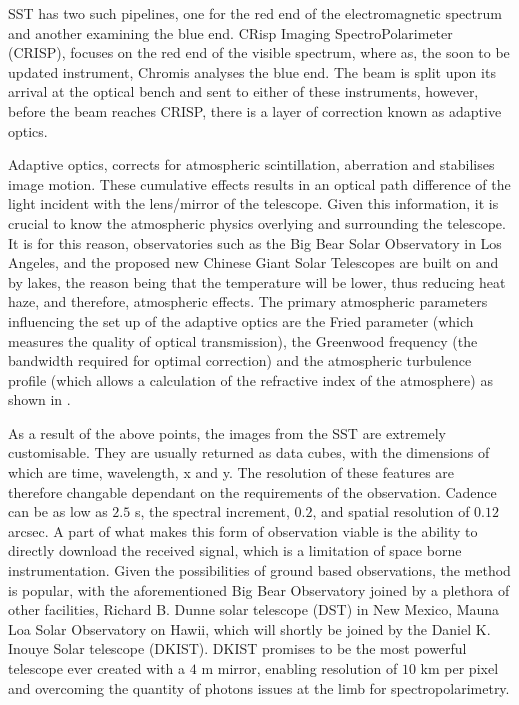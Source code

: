 SST has two such pipelines, one for the red end of the electromagnetic spectrum and another examining the blue end.
CRisp Imaging SpectroPolarimeter (CRISP), focuses on the red end of the visible spectrum, where as, the soon to be updated instrument, Chromis analyses the blue end.
The beam is split upon its arrival at the optical bench and sent to either of these instruments, however, before the beam reaches CRISP, there is a layer of correction known as adaptive optics.

Adaptive optics, corrects for atmospheric scintillation, aberration and stabilises image motion.
These cumulative effects results in an optical path difference of the light incident with the lens/mirror of the telescope.
Given this information, it is crucial to know the atmospheric physics overlying and surrounding the telescope.
It is for this reason, observatories such as the Big Bear Solar Observatory \citep{Cao2010} in Los Angeles, and the proposed new Chinese Giant Solar Telescopes \citep{Liu2014} are built on and by lakes, the reason being that the temperature will be lower, thus reducing heat haze, and therefore, atmospheric effects.
The primary atmospheric parameters influencing the set up of the adaptive optics are the Fried parameter (which measures the quality of optical transmission), the Greenwood frequency (the bandwidth required for optimal correction) and the atmospheric turbulence profile (which allows a calculation of the refractive index of the atmosphere) as shown in \cite{Rimmele2011}.

As a result of the above points, the images from the SST are extremely customisable.
They are usually returned as data cubes, with the dimensions of which are time, wavelength, x and y.
The resolution of these features are therefore changable dependant on the requirements of the observation.
Cadence can be as low as $2.5$ s, the spectral increment, $0.2$, and spatial resolution of $0.12$ arcsec.
A part of what makes this form of observation viable is the ability to directly download the received signal, which is a limitation of space borne instrumentation.
Given the possibilities of ground based observations, the method is popular, with the aforementioned Big Bear Observatory joined by a plethora of other facilities, Richard B. Dunne solar telescope (DST) in New Mexico, Mauna Loa Solar Observatory on Hawii, which will shortly be joined by the Daniel K. Inouye Solar telescope (DKIST).
DKIST promises to be the most powerful telescope ever created with a $4$ m mirror, enabling resolution of $10$ km per pixel and overcoming the quantity of photons issues at the limb for spectropolarimetry.



